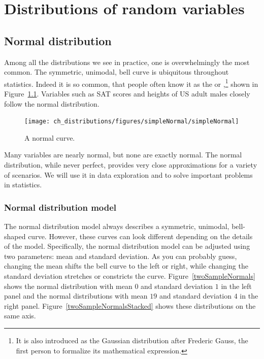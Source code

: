 \chapter{Distributions of random variables}
\label{modeling}


\section{Normal distribution}
\label{normalDist}

Among all the distributions we see in practice, one is overwhelmingly the most common. The symmetric, unimodal, bell curve is ubiquitous throughout statistics. Indeed it is so common, that people often know it as the  or ,\footnote{It is also introduced as the Gaussian distribution after Frederic Gauss, the first person to formalize its mathematical expression.} shown in Figure~\ref{simpleNormal}. Variables such as SAT scores and heights of US adult males closely follow the normal distribution.

\begin{figure}
\centering
\texttt{[image: ch\_distributions/figures/simpleNormal/simpleNormal]}
\caption{A normal curve.}
\label{simpleNormal}
\end{figure}

\begin{termBox}{
Many variables are nearly normal, but none are exactly normal. The normal distribution, while never perfect, provides very close approximations for a variety of scenarios. We will use it in data exploration and to solve important problems in statistics.\vspace{0.7mm}}
\end{termBox}

\subsection{Normal distribution model}

The normal distribution model always describes a symmetric, unimodal, bell-shaped curve. However, these curves can look different depending on the details of the model. Specifically, the normal distribution model can be adjusted using two parameters: mean and standard deviation. As you can probably guess, changing the mean shifts the bell curve to the left or right, while changing the standard deviation stretches or constricts the curve. Figure~\ref{twoSampleNormals} shows the normal distribution with mean $0$ and standard deviation $1$ in the left panel and the normal distributions with mean $19$ and standard deviation $4$ in the right panel. Figure~\ref{twoSampleNormalsStacked} shows these distributions on the same axis.

